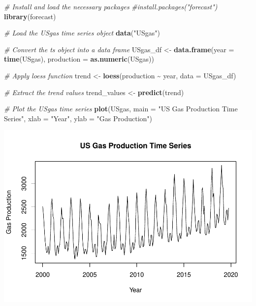\documentclass[
]{book}
\newenvironment{Shaded}{\begin{snugshade}}{\end{snugshade}}
\newcommand{\AttributeTok}[1]{\textcolor[rgb]{0.13,0.29,0.53}{#1}}
\newcommand{\CommentTok}[1]{\textcolor[rgb]{0.56,0.35,0.01}{\textit{#1}}}
\newcommand{\FunctionTok}[1]{\textcolor[rgb]{0.13,0.29,0.53}{\textbf{#1}}}
\newcommand{\NormalTok}[1]{#1}
\newcommand{\OtherTok}[1]{\textcolor[rgb]{0.56,0.35,0.01}{#1}}
\newcommand{\SpecialCharTok}[1]{\textcolor[rgb]{0.81,0.36,0.00}{\textbf{#1}}}
\newcommand{\StringTok}[1]{\textcolor[rgb]{0.31,0.60,0.02}{#1}}
\begin{document}
\begin{Shaded}
\begin{Highlighting}[]
\CommentTok{\# Install and load the necessary packages}
\CommentTok{\#install.packages("forecast")}
\FunctionTok{library}\NormalTok{(forecast)}

\CommentTok{\# Load the USgas time series object}
\FunctionTok{data}\NormalTok{(}\StringTok{"USgas"}\NormalTok{)}

\CommentTok{\# Convert the ts object into a data frame}
\NormalTok{USgas\_df }\OtherTok{\textless{}{-}} \FunctionTok{data.frame}\NormalTok{(}\AttributeTok{year =} \FunctionTok{time}\NormalTok{(USgas), }\AttributeTok{production =} \FunctionTok{as.numeric}\NormalTok{(USgas))}

\CommentTok{\# Apply loess function}
\NormalTok{trend }\OtherTok{\textless{}{-}} \FunctionTok{loess}\NormalTok{(production }\SpecialCharTok{\textasciitilde{}}\NormalTok{ year, }\AttributeTok{data =}\NormalTok{ USgas\_df)}

\CommentTok{\# Extract the trend values}
\NormalTok{trend\_values }\OtherTok{\textless{}{-}} \FunctionTok{predict}\NormalTok{(trend)}

\CommentTok{\# Plot the USgas time series}
\FunctionTok{plot}\NormalTok{(USgas, }\AttributeTok{main =} \StringTok{"US Gas Production Time Series"}\NormalTok{, }\AttributeTok{xlab =} \StringTok{"Year"}\NormalTok{, }\AttributeTok{ylab =} \StringTok{"Gas Production"}\NormalTok{)}
\end{Highlighting}
\end{Shaded}

\includegraphics{_main_files/figure-latex/unnamed-chunk-62-1.pdf}
\end{document}
